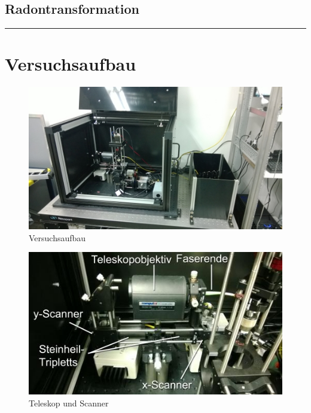 \subsection{Radontransformation}

 \nopagebreak
 \hrule height 0pt
 \pagebreak[2]
\section{Versuchsaufbau}
\begin{minipage}{\linewidth}
\begin{figure}[H]
	\centering
\includegraphics[width=1.0\linewidth]{IMAGE/versuchsaufbau.png}
	\caption{Versuchsaufbau}
	\label{fig:versuchsaufbau}
\end{figure} 

\begin{figure}[H]
	\centering
\includegraphics[width=1.0\linewidth]{IMAGE/scanner.jpeg}
	\caption{Teleskop und Scanner}
	\label{fig:scanner}
\end{figure}

\end{minipage}

